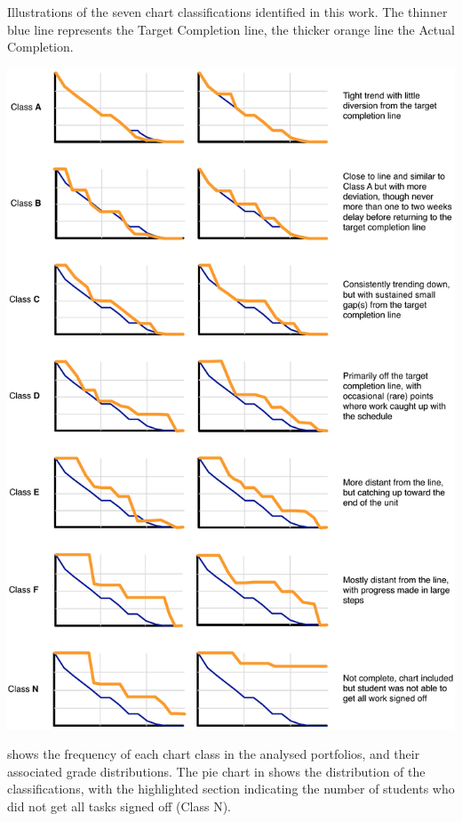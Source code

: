 \begin{table}[p]
  \centering
  \caption{Illustrations of the seven chart classifications identified in this work. The thinner blue line represents the Target Completion line, the thicker orange line the Actual Completion.}
  \label{tbl:chart_types}
  \includegraphics[width=\textwidth]{CharTypes}
\end{table}

 shows the frequency of each chart class in the analysed portfolios, and their associated grade distributions. The pie chart in  shows the distribution of the classifications, with the highlighted section indicating the number of students who did not get all tasks signed off (Class N).

